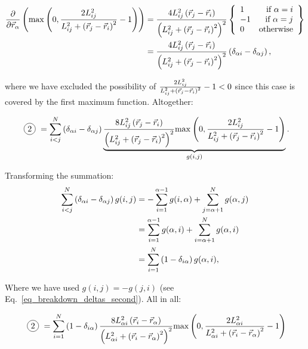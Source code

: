 \documentclass[a4paper]{article}
\newcommand*\circled[1]{
  \tikz[baseline=(char.base)]{
    \node[shape=circle,draw,inner sep=2pt] (char) {#1};
  }
}
\begin{document}
\begin{align*}
  \frac{\partial}{\partial \vec{r}_{\alpha}} \left( \textrm{max}^{} \left( 0, \frac{ 2 L_{ij}^{2} }{ L_{ij}^{2} + \left( \vec{r}_{j} - \vec{r}_{i} \right)^{2} } - 1 \right) \right)
  &=\frac{
    4 L_{ij}^{2} \left( \vec{r}_{j} - \vec{r}_{i} \right)
  }{
    \left(
      L_{ij}^{2} + \left( \vec{r}_{j} - \vec{r}_{i} \right)^2
    \right)^2
  } \left\{ \begin{array}{lr}
    1 & \textrm{if }\alpha = i\\
    - 1 & \textrm{if }\alpha = j\\
    0 & \textrm{otherwise}
  \end{array} \right\}\\
  &= \frac{
    4 L_{ij}^{2} \left( \vec{r}_{j} - \vec{r}_{i} \right)
  }{
    \left(
      L_{ij}^{2} + \left( \vec{r}_{j} - \vec{r}_{i} \right)^2
    \right)^2
  } \left(
    \delta_{\alpha i} - \delta_{\alpha j} 
  \right),
\end{align*}

where we have excluded the possibility of $\frac{ 2 L_{ij}^{2} }{ L_{ij}^{2} + \left( \vec{r}_{j} - \vec{r}_{i} \right)^{2} } - 1 < 0$
since this case is covered by the first maximum function. Altogether:

\begin{equation}\label{eq_breakdown_deltas_second}
  \text{\circled{2}}
  = \ijNSum \left(
    \delta_{\alpha i} - \delta_{\alpha j} 
  \right) \underbrace{
    \frac{
      8 L_{ij}^{2} \posVecDiff{j}{i}
    }{
      \left(
        L_{ij}^{2} + \posVecDiff{j}{i}^2
      \right)^2
    } \distanceErrorSecondTerm{}
  }_{g(i, j)}.
\end{equation}

Transforming the summation:
\begin{align}
  \sum_{i < j}^{N} \left( \delta_{\alpha i} - \delta_{\alpha j} \right) g(i, j)
  &= - \sum_{i = 1}^{\alpha - 1} g(i, \alpha) 
    + \sum_{j = \alpha + 1}^{N} g(\alpha, j)\\
  &= \sum_{i = 1}^{\alpha - 1} g(\alpha, i) 
    + \sum_{i = \alpha + 1}^{N} g(\alpha, i)\\
  &= \sum_{i = 1}^{N} \left(1 - \delta_{i\alpha} \right) g(\alpha, i),
\end{align}

Where we have used $g(i, j) = -g(j, i)$ (see
Eq.~\ref{eq_breakdown_deltas_second}). All in all:

\begin{equation}
  \text{\circled{2}}
  = \iNSum \left(1 - \delta_{i\alpha}\right) 
    \frac{
      8 L_{\alpha i}^{2} \posVecDiff{i}{\alpha}
    }{
      \left(
        L_{\alpha i}^{2} + \posVecDiff{i}{\alpha}^2
      \right)^2
    } \textrm{max} \left(
      0,
      \frac{
        2 L_{\alpha i}^{2}
      }{
        L_{\alpha i}^{2} + \posVecDiff{i}{\alpha}^{2}
      } - 1
    \right)
\end{equation}
\end{document}
